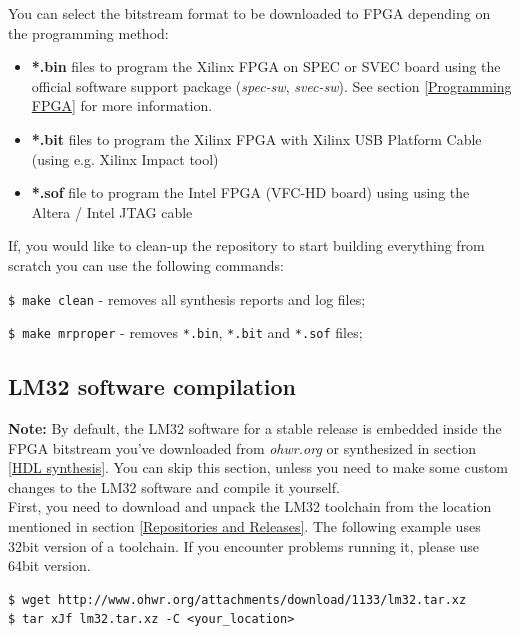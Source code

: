 \documentclass[a4paper, 12pt]{article}
\begin{document}
You can select the bitstream format to be downloaded to FPGA depending on the
programming method:
\begin{itemize}
  \item \textbf{*.bin} files to program the Xilinx FPGA on SPEC or SVEC board
    using the official software support package (\textit{spec-sw},
    \textit{svec-sw}). See section \ref{Programming FPGA} for more
    information.
  \item \textbf{*.bit} files to program the Xilinx FPGA with Xilinx USB Platform
    Cable (using e.g. Xilinx Impact tool)
  \item \textbf{*.sof} file to program the Intel FPGA (VFC-HD board) using using
    the Altera / Intel JTAG cable
\end{itemize}

If, you would like to clean-up the repository to start building everything from
scratch you can use the following commands:
\begin{itemize*}
\item \texttt{\$ make clean} - removes all synthesis reports and log files;
\item \texttt{\$ make mrproper} - removes \texttt{*.bin}, \texttt{*.bit} and
  \texttt{*.sof} files;
\end{itemize*}

\subsection{LM32 software compilation}
\label{LM32 software compilation}

\textbf{Note:} By default, the LM32 software for a stable release is embedded
inside the FPGA bitstream you've downloaded from \textit{ohwr.org} or
synthesized in section \ref{HDL synthesis}. You can skip this section, unless
you need to make some custom changes to the LM32 software and compile it
yourself.\\

First, you need to download and unpack the LM32 toolchain from the location
mentioned in section \ref{Repositories and Releases}. The following example
uses 32bit version of a toolchain. If you encounter problems running it, please
use 64bit version.
\begin{lstlisting}
$ wget http://www.ohwr.org/attachments/download/1133/lm32.tar.xz
$ tar xJf lm32.tar.xz -C <your_location>
\end{lstlisting}
\end{document}
